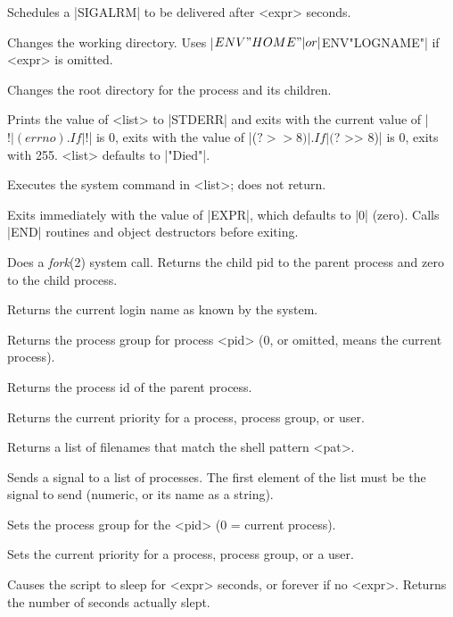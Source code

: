 \documentclass{refbase}
\begin{document}
\begin{enum}{1cm}

Schedules a |SIGALRM| to be delivered after <expr> seconds. 

Changes the working directory.
\newline Uses |$ENV{"HOME"}| or |$ENV{"LOGNAME"}| if <expr> is omitted.

Changes the root directory for the process and its children.

Prints the value of <list> to |STDERR| and exits with the current
value of |$!| (errno). If |$!| is 0, exits with the value of |($? >> 8)|.
If |($? >> 8)| is 0, exits with 255. <list> defaults to
|"Died"|.

Executes the system command in <list>; does not return.

Exits immediately with the value of |EXPR|, which defaults to |0| (zero).
Calls |END| routines and object destructors before exiting.

Does a {\it fork\/}(2) system call. Returns the child pid to the parent
process and zero to the child process. 

Returns the current login name as known by the system.

Returns the process group for process <pid> (0, or omitted,  means the
current process). 

Returns the process id of the parent process.

Returns the current priority for a process, process group, or user.

Returns a list of filenames that match the shell pattern <pat>.

Sends a signal to a list of processes. The first element of the list
must be the signal to send (numeric, or its name as a string). 

Sets the process group for the <pid> (0 = current process).

Sets the current priority for a process, process group, or a user.

Causes the script to sleep for <expr> seconds, or forever if no
<expr>. Returns the number of seconds actually slept. 


\end{enum}
\end{document}
